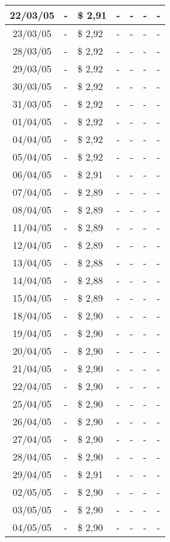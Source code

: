 \begin{center}
\begin{longtable}{|c|p{1.5cm}|p{1.5cm}|p{1.5cm}|p{1.5cm}|p{1.5cm}|p{1.5cm}|}
22/03/05 & - & \$ 2,91 & - & - & - & - \\ \hline
23/03/05 & - & \$ 2,92 & - & - & - & - \\ \hline
28/03/05 & - & \$ 2,92 & - & - & - & - \\ \hline
29/03/05 & - & \$ 2,92 & - & - & - & - \\ \hline
30/03/05 & - & \$ 2,92 & - & - & - & - \\ \hline
31/03/05 & - & \$ 2,92 & - & - & - & - \\ \hline
01/04/05 & - & \$ 2,92 & - & - & - & - \\ \hline
04/04/05 & - & \$ 2,92 & - & - & - & - \\ \hline
05/04/05 & - & \$ 2,92 & - & - & - & - \\ \hline
06/04/05 & - & \$ 2,91 & - & - & - & - \\ \hline
07/04/05 & - & \$ 2,89 & - & - & - & - \\ \hline
08/04/05 & - & \$ 2,89 & - & - & - & - \\ \hline
11/04/05 & - & \$ 2,89 & - & - & - & - \\ \hline
12/04/05 & - & \$ 2,89 & - & - & - & - \\ \hline
13/04/05 & - & \$ 2,88 & - & - & - & - \\ \hline
14/04/05 & - & \$ 2,88 & - & - & - & - \\ \hline
15/04/05 & - & \$ 2,89 & - & - & - & - \\ \hline
18/04/05 & - & \$ 2,90 & - & - & - & - \\ \hline
19/04/05 & - & \$ 2,90 & - & - & - & - \\ \hline
20/04/05 & - & \$ 2,90 & - & - & - & - \\ \hline
21/04/05 & - & \$ 2,90 & - & - & - & - \\ \hline
22/04/05 & - & \$ 2,90 & - & - & - & - \\ \hline
25/04/05 & - & \$ 2,90 & - & - & - & - \\ \hline
26/04/05 & - & \$ 2,90 & - & - & - & - \\ \hline
27/04/05 & - & \$ 2,90 & - & - & - & - \\ \hline
28/04/05 & - & \$ 2,90 & - & - & - & - \\ \hline
29/04/05 & - & \$ 2,91 & - & - & - & - \\ \hline
02/05/05 & - & \$ 2,90 & - & - & - & - \\ \hline
03/05/05 & - & \$ 2,90 & - & - & - & - \\ \hline
04/05/05 & - & \$ 2,90 & - & - & - & - \\ \hline

\end{longtable}
\end{center}

